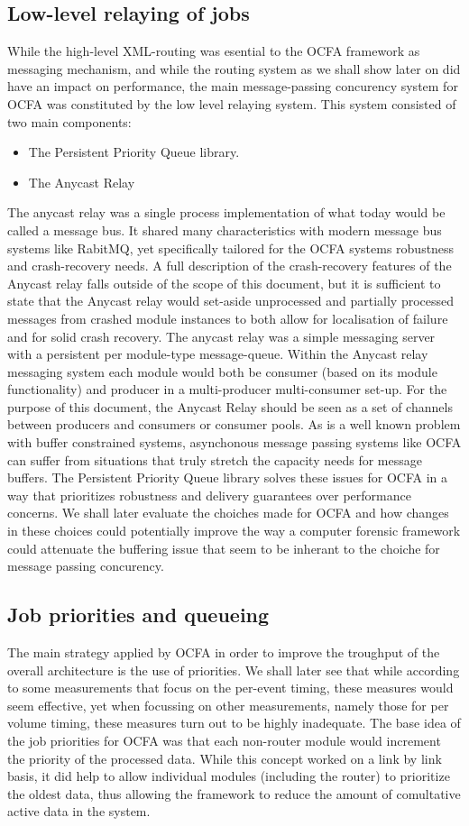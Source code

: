 \subsection{Low-level relaying of jobs}
While the high-level XML-routing was esential to the OCFA framework as messaging mechanism, and while the routing system as we shall show later on did have an impact on performance, the main message-passing concurency system for OCFA was constituted by the low level relaying system. This system consisted of two main components:
\begin{itemize}
\item The Persistent Priority Queue library.
\item The Anycast Relay
\end{itemize}
The anycast relay was a single process implementation of what today would be called a message bus. It shared many characteristics with modern message bus systems like RabitMQ, yet specifically tailored for the OCFA systems robustness and crash-recovery needs. A full description of the crash-recovery features of the Anycast relay falls outside of the scope of this document, but it is sufficient to state that the Anycast relay would set-aside unprocessed and partially processed messages from crashed module instances to both allow for localisation of failure and for solid crash recovery. The anycast relay was a simple messaging server with a persistent per module-type message-queue. Within the 
Anycast relay messaging system each module would both be consumer (based on its module functionality) and producer in a multi-producer multi-consumer set-up. 
For the purpose of this document, the Anycast Relay should be seen as a set of channels between producers and consumers or consumer pools. As is a well known problem with buffer constrained systems, asynchonous message passing systems like OCFA can suffer from situations that truly stretch the capacity needs for message buffers. The Persistent Priority Queue library solves these issues for OCFA in a way that prioritizes robustness and delivery guarantees over performance concerns. We shall later evaluate the choiches made for OCFA and how changes in these choices could potentially improve the way a computer forensic framework could attenuate the buffering issue that seem to be inherant to the choiche for message passing concurency. 
\subsection{Job priorities and queueing}
The main strategy applied by OCFA in order to improve the troughput of the overall architecture is the use of priorities. We shall later see that while according to some measurements that focus on the per-event timing, these measures would seem effective, yet when focussing on other measurements, namely those for per volume timing, these measures turn out to be highly inadequate. The base idea of the job priorities for OCFA was that each non-router module would increment the priority of the processed data. While this concept worked on a link by link basis, it did help to allow individual modules (including the router) to prioritize the oldest data, thus allowing the framework to reduce the amount of comultative active data in the system. 
